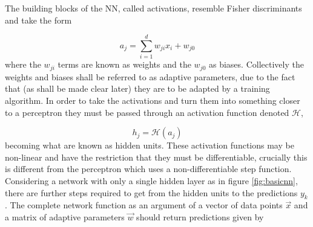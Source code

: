 
The building blocks of the NN, called activations, resemble Fisher
discriminants \cite{Fisher} and take the form

\begin{equation}
a_j = \sum_{i=1}^{d} w_{ji}x_{i} + w_{j0}
\label{eq:fisher}
\end{equation}
where the $w_{ji}$ terms are known as weights and the $w_{j0}$ as biases.
Collectively the weights and biases shall be referred to as adaptive parameters,
due to the fact that (as shall be made clear later) they are to be adapted by a
training algorithm. In order to take the activations and turn them into
something closer to a perceptron \cite{Rosenblatt} they must be passed through
an activation function denoted $\mathcal{H}$,

\begin{equation}
h_j = \mathcal{H}(a_j)
\label{eq:hiddenunit}
\end{equation}
becoming what are known as hidden units. These activation functions may be
non-linear and have the restriction that they must be differentiable, crucially
this is different from the perceptron which uses a non-differentiable step
function. Considering a network with only a single hidden layer as in figure
\ref{fig:basicnn}, there are further steps required to get from the hidden units
to the predictions $y_k$. The complete network function as an argument of a
vector of data points $\vec{x}$ and a matrix of adaptive parameters
$\vec{w}$ should return predictions given by


